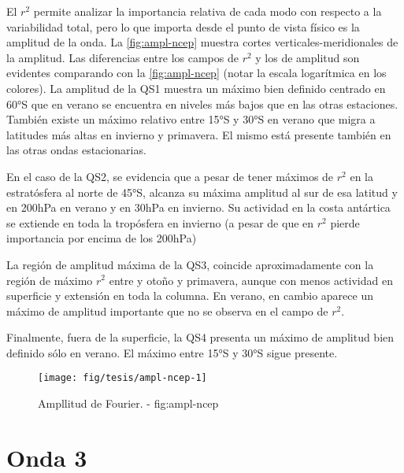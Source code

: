 \documentclass[spanish,a4paper,12p]{book}
\begin{document}
El \(r^2\) permite analizar la importancia relativa de cada modo con
respecto a la variabilidad total, pero lo que importa desde el punto de
vista físico es la amplitud de la onda. La \autoref{fig:ampl-ncep}
muestra cortes verticales-meridionales de la amplitud. Las diferencias
entre los campos de \(r^2\) y los de amplitud son evidentes comparando
con la \autoref{fig:ampl-ncep} (notar la escala logarítmica en los
colores). La amplitud de la QS1 muestra un máximo bien definido centrado
en 60°S que en verano se encuentra en niveles más bajos que en las otras
estaciones. También existe un máximo relativo entre 15°S y 30°S en
verano que migra a latitudes más altas en invierno y primavera. El mismo
está presente también en las otras ondas estacionarias.

En el caso de la QS2, se evidencia que a pesar de tener máximos de
\(r^2\) en la estratósfera al norte de 45°S, alcanza su máxima amplitud
al sur de esa latitud y en 200hPa en verano y en 30hPa en invierno. Su
actividad en la costa antártica se extiende en toda la tropósfera en
invierno (a pesar de que en \(r^2\) pierde importancia por encima de los
200hPa)

La región de amplitud máxima de la QS3, coincide aproximadamente con la
región de máximo \(r^2\) entre y otoño y primavera, aunque con menos
actividad en superficie y extensión en toda la columna. En verano, en
cambio aparece un máximo de amplitud importante que no se observa en el
campo de \(r^2\).

Finalmente, fuera de la superficie, la QS4 presenta un máximo de
amplitud bien definido sólo en verano. El máximo entre 15°S y 30°S sigue
presente.

\begin{landscape}\begin{figure}

{\centering \texttt{[image: fig/tesis/ampl-ncep-1]} 

}

\caption{Ampllitud de Fourier. - fig:ampl-ncep}\label{fig:ampl-ncep}
\end{figure}
\end{landscape}


\chapter{Onda 3}\label{onda-3}
\end{document}
